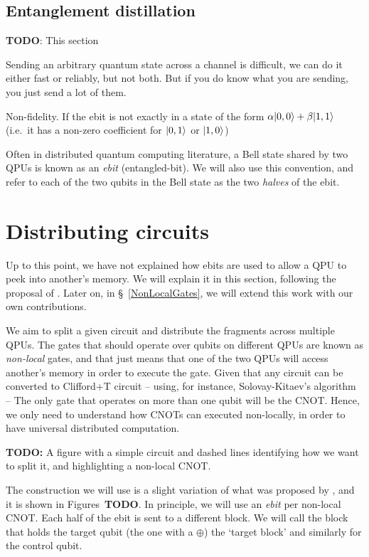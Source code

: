 \subsection{Entanglement distillation}
\label{Distillation}

\textbf{TODO}: This section

Sending an arbitrary quantum state across a channel is difficult, we can do it either fast or reliably, but not both. But if you do know what you are sending, you just send a lot of them.

Non-fidelity. If the ebit is not exactly in a state of the form \(\alpha\vert 0,0 \rangle + \beta\vert 1,1 \rangle\) (i.e.\ it has a non-zero coefficient for \(\vert 0,1 \rangle\) or \(\vert 1,0 \rangle\))

Often in distributed quantum computing literature, a Bell state shared by two QPUs is known as an \textit{ebit} (entangled-bit). We will also use this convention, and refer to each of the two qubits in the Bell state as the two \textit{halves} of the ebit.

\section{Distributing circuits}
\label{IntroDistributing}

Up to this point, we have not explained how ebits are used to allow a QPU to peek into another's memory. We will explain it in this section, following the proposal of \citet{NonLocalCNOT}. Later on, in \S~\ref{NonLocalGates}, we will extend this work with our own contributions. 

We aim to split a given circuit and distribute the fragments across multiple QPUs. The gates that  should operate over qubits on different QPUs are known as \textit{non-local} gates, and that just means that one of the two QPUs will access another's memory in order to execute the gate. Given that any circuit can be converted to Clifford+T circuit -- using, for instance, Solovay-Kitaev's algorithm -- The only gate that operates on more than one qubit will be the CNOT. Hence, we only need to understand how CNOTs can executed non-locally, in order to have universal distributed computation.

\textbf{TODO:} A figure with a simple circuit and dashed lines identifying how we want to split it, and highlighting a non-local CNOT.

The construction we will use is a slight variation of what was proposed by \citet{NonLocalCNOT}, and it is shown in Figures~\textbf{TODO}. In principle, we will use an \textit{ebit} per non-local CNOT. Each half of the ebit is sent to a different block. We will call the block that holds the target qubit (the one with a \(\oplus\)) the `target block' and similarly for the control qubit. 

